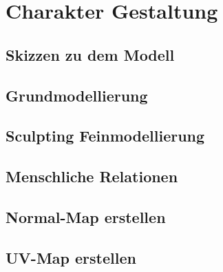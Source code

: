 \section{Charakter Gestaltung}
\subsection{Skizzen zu dem Modell}
\subsection{Grundmodellierung}
\subsection{Sculpting Feinmodellierung}
\subsection{Menschliche Relationen}
\subsection{Normal-Map erstellen}
\subsection{UV-Map erstellen}